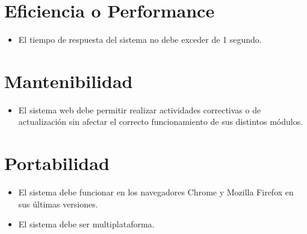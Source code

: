 \section{Eficiencia o Performance} 
\begin{itemize}
\item El tiempo de respuesta del sistema no debe exceder de 1 segundo.
\end{itemize}
\section{Mantenibilidad} 
\begin{itemize}
\item El sistema web debe permitir realizar actividades correctivas o de actualización sin afectar el correcto funcionamiento de sus distintos módulos.
\end{itemize}
\section{Portabilidad} 
\begin{itemize}
\item El sistema debe funcionar en los navegadores Chrome y Mozilla Firefox en sus últimas versiones.
\item El sistema debe ser multiplataforma.
\end{itemize}

